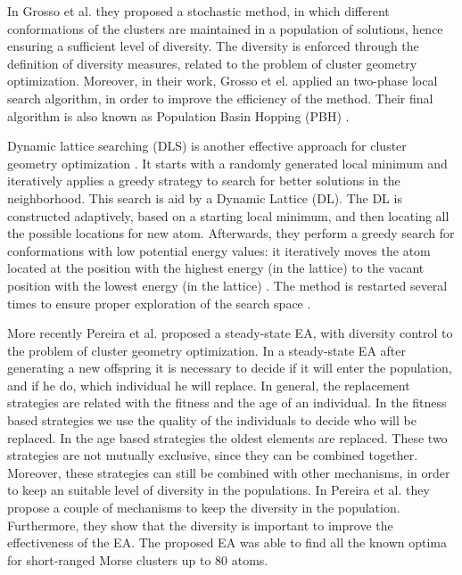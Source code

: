 		In Grosso et al. \cite{grosso07} they proposed a stochastic method, in which different conformations of the clusters are maintained in a population of solutions, hence ensuring a sufficient level of diversity. The diversity is enforced through the definition of diversity measures, related to the problem of cluster geometry optimization. Moreover, in their work, Grosso et el. applied an two-phase local search algorithm, in order to improve the efficiency of the method. Their final algorithm is also known as Population Basin Hopping (PBH) \cite{grosso07}.
		
		Dynamic lattice searching (DLS) is another effective approach for cluster geometry optimization \cite{cheng07}. It starts with a randomly generated local minimum and iteratively applies a greedy strategy to search for better solutions in the neighborhood. This search is aid by a Dynamic Lattice (DL). The DL is constructed adaptively, based on a starting local minimum, and then locating all the possible locations for new atom. Afterwards, they perform a greedy search for conformations with low potential energy values: it iteratively moves the atom located at the position with the highest energy (in the lattice) to the vacant position with the lowest energy (in the lattice) \cite{cheng07, shao04}. The method is restarted several times to ensure proper exploration of the search space \cite{cheng07}.
			
		More recently Pereira et al.\cite{xico09} proposed a steady-state EA, with diversity control to the problem of cluster geometry optimization. In a steady-state EA after generating a new offspring it is necessary to decide if it will enter the population, and if he do, which individual he will replace. In general, the replacement strategies are related with the fitness and the age of an individual. In the fitness based strategies we use the quality of the individuals to decide who will be replaced. In the age based strategies the oldest elements are replaced. These two strategies are not mutually exclusive, since they can be combined together. Moreover, these strategies can still be combined with other mechanisms, in order to keep an suitable level of diversity in the populations.
		In Pereira et al.\cite{xico09} they propose a couple of mechanisms to keep the diversity in the population. Furthermore, they show that the diversity is important to improve the effectiveness of the EA. The proposed EA was able to find all the known optima for short-ranged Morse clusters up to 80 atoms.
		
